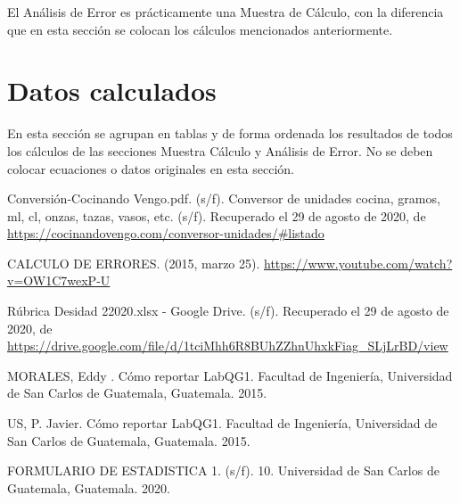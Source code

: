 \documentclass[osajnl,showpacs,superscriptaddress,10pt]{article}
\begin{document}
El Análisis de Error es prácticamente una Muestra de Cálculo, con la diferencia que en esta sección se colocan los cálculos mencionados anteriormente.


\section{Datos calculados}

En esta sección se agrupan en tablas y de forma ordenada los resultados de todos los cálculos de las secciones Muestra Cálculo y Análisis de Error. No se deben colocar ecuaciones o datos originales en esta sección.


\begin{thebibliography}{99}


\bibitem{} Conversión-Cocinando Vengo.pdf. (s/f).
Conversor de unidades cocina, gramos, ml, cl, onzas, tazas, vasos, etc. (s/f). Recuperado el 29 de agosto de 2020, de \url{https://cocinandovengo.com/conversor-unidades/#listado}

\bibitem{} CALCULO DE ERRORES. (2015, marzo 25). \url{https://www.youtube.com/watch?v=OW1C7wexP-U}

\bibitem{} Rúbrica Desidad 22020.xlsx - Google Drive. (s/f). Recuperado el 29 de agosto de 2020, de \url{https://drive.google.com/file/d/1tciMhh6R8BUhZZhnUhxkFiag_SLjLrBD/view}

\bibitem{} MORALES, Eddy . Cómo reportar LabQG1. Facultad de Ingeniería,
Universidad de San Carlos de Guatemala, Guatemala. 2015.

\bibitem{}  US, P. Javier. Cómo reportar LabQG1. Facultad de Ingeniería, Universidad
de San Carlos de Guatemala, Guatemala. 2015.

\bibitem{} FORMULARIO DE ESTADISTICA 1. (s/f). 10. Universidad de San Carlos de Guatemala, Guatemala. 2020.



\end{thebibliography}
\end{document}
